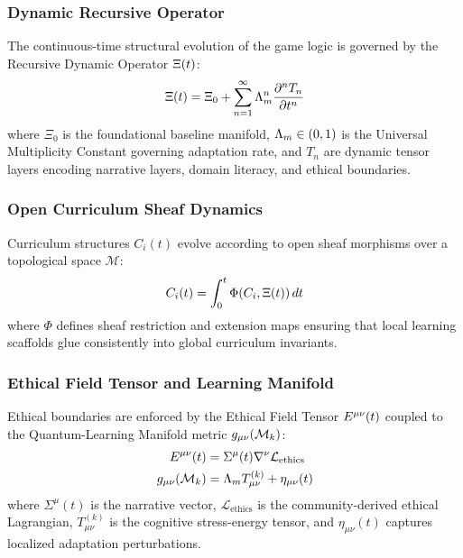 \subsubsection{Dynamic Recursive Operator}
The continuous-time structural evolution of the game logic is governed by the Recursive Dynamic Operator $\Xi(t)$:
\begin{equation}
\label{eq:xi_operator}
\Xi(t) = \Xi_0 + \sum_{n=1}^{\infty} \Lambda_m^n \frac{\partial^n T_n}{\partial t^n}
\end{equation}
where $\Xi_0$ is the foundational baseline manifold, $\Lambda_m \in (0, 1)$ is the Universal Multiplicity Constant governing adaptation rate, and $T_n$ are dynamic tensor layers encoding narrative layers, domain literacy, and ethical boundaries.

\subsubsection{Open Curriculum Sheaf Dynamics}
Curriculum structures $C_i(t)$ evolve according to open sheaf morphisms over a topological space $\mathcal{M}$:
\begin{equation}
C_i(t) = \int_0^t \Phi(C_i, \Xi(t))\, dt
\end{equation}
where $\Phi$ defines sheaf restriction and extension maps ensuring that local learning scaffolds glue consistently into global curriculum invariants.

\subsubsection{Ethical Field Tensor and Learning Manifold}
Ethical boundaries are enforced by the Ethical Field Tensor $E^{\mu\nu}(t)$ coupled to the Quantum-Learning Manifold metric $g_{\mu\nu}(\mathcal{M}_k)$:
\begin{align}
E^{\mu\nu}(t) &= \Sigma^\mu(t) \nabla^\nu \mathcal{L}_{\text{ethics}} \\
g_{\mu\nu}(\mathcal{M}_k) &= \Lambda_m T_{\mu\nu}^{(k)} + \eta_{\mu\nu}(t)
\end{align}
where $\Sigma^\mu(t)$ is the narrative vector, $\mathcal{L}_{\text{ethics}}$ is the community-derived ethical Lagrangian, $T_{\mu\nu}^{(k)}$ is the cognitive stress-energy tensor, and $\eta_{\mu\nu}(t)$ captures localized adaptation perturbations.

